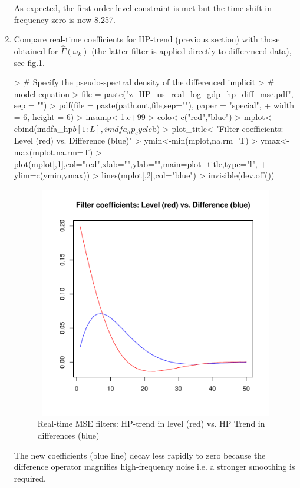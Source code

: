 \documentclass[a4paper]{book}
\begin{document}
\begin{enumerate}
As expected, the first-order level constraint is met but the time-shift in frequency zero is now 8.257. 
\item Compare real-time coefficients for HP-trend (previous section) with those obtained for $\hat{\Gamma}(\omega_k)$ (the latter filter is applied directly to differenced data), see fig.\ref{z_HP_us_real_log_gdp_hp_diff_mse}. 
\begin{Schunk}
\begin{Sinput}
> # Specify the pseudo-spectral density of the differenced implicit 
> #   model equation
> file = paste("z_HP_us_real_log_gdp_hp_diff_mse.pdf", sep = "")
> pdf(file = paste(path.out,file,sep=""), paper = "special", 
+     width = 6, height = 6)
> insamp<-1.e+99
> colo<-c("red","blue")
> mplot<-cbind(imdfa_hp$b[1:L],imdfa_hp_cycle$b)
> plot_title<-"Filter coefficients: Level (red) vs. Difference (blue)"
> ymin<-min(mplot,na.rm=T)
> ymax<-max(mplot,na.rm=T)
> plot(mplot[,1],col="red",xlab="",ylab="",main=plot_title,type="l",
+      ylim=c(ymin,ymax))
> lines(mplot[,2],col="blue")
> invisible(dev.off())
\end{Sinput}
\end{Schunk}
\begin{figure}[H]\begin{center}\includegraphics[height=4in, width=6in]{z_HP_us_real_log_gdp_hp_diff_mse}\caption{Real-time MSE filters: HP-trend in level (red) vs. HP Trend in differences (blue)\label{z_HP_us_real_log_gdp_hp_diff_mse}}\end{center}\end{figure}The new coefficients (blue line) decay less rapidly to zero because the difference operator magnifies high-frequency noise i.e. a stronger smoothing is required.

\end{enumerate}
\end{document}
